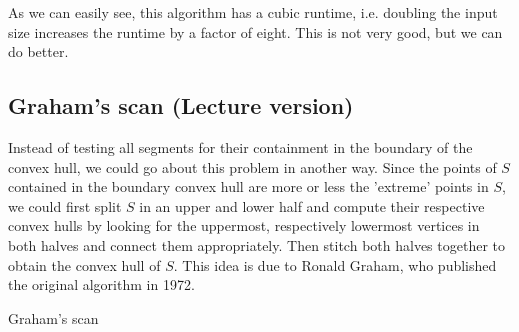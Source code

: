         As we can easily see, this algorithm has a cubic runtime, i.e. doubling the input size increases the runtime by a factor of eight. This is not very good, but we can do better. 

    \subsection{Graham's scan (Lecture version)}
        Instead of testing all segments for their containment in the boundary of the convex hull, we could go about this problem in another way. Since the points of $S$ contained in the boundary convex hull are more or less the 'extreme' points in $S$, we could first split $S$ in an upper and lower half and compute their respective convex hulls by looking for the uppermost, respectively lowermost vertices in both halves and connect them appropriately. Then stitch both halves together to obtain the convex hull of $S$. This idea is due to Ronald Graham, who published the original algorithm in 1972.

        \begin{breakablealgorithm}
            \caption{Graham's scan}
            \label{alg:convex_hull_graham}
            \begin{algorithmic}[1]
                     
                     
                        \EndWhile
                    \EndFor
                     
                        \EndWhile
                    \EndFor
                    \State{}
                \EndProcedure
            \end{algorithmic}
        \end{breakablealgorithm} 

